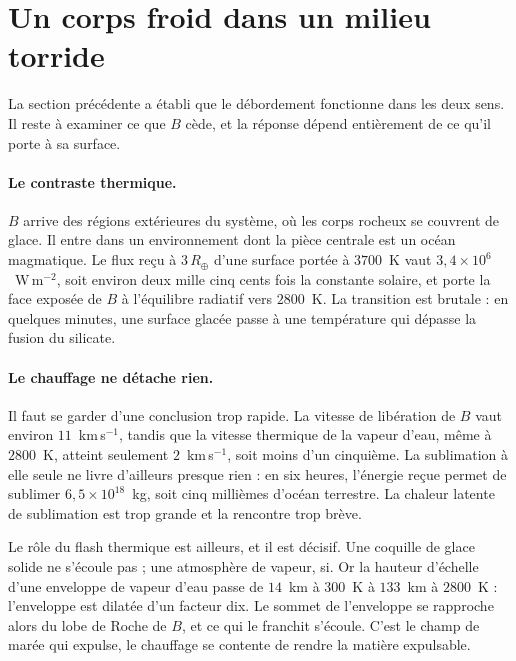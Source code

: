 \documentclass[11pt,a4paper,openany]{report}
\newcommand{\Rt}{R_{\oplus}}
\begin{document}
\section{Un corps froid dans un milieu torride}
\label{sec:eau}

La section précédente a établi que le débordement fonctionne dans les deux sens. Il reste à
examiner ce que $B$ cède, et la réponse dépend entièrement de ce qu'il porte à sa surface.

\paragraph{Le contraste thermique.} $B$ arrive des régions extérieures du système, où les corps
rocheux se couvrent de glace. Il entre dans un environnement dont la pièce centrale est un océan
magmatique. Le flux reçu à $3\,\Rt$ d'une surface portée à $3700$~K vaut
$3{,}4\times10^{6}$~W\,m$^{-2}$, soit environ deux mille cinq cents fois la constante solaire, et
porte la face exposée de $B$ à l'équilibre radiatif vers $2800$~K. La transition est brutale : en
quelques minutes, une surface glacée passe à une température qui dépasse la fusion du silicate.

\paragraph{Le chauffage ne détache rien.} Il faut se garder d'une conclusion trop rapide. La
vitesse de libération de $B$ vaut environ $11$~km\,s$^{-1}$, tandis que la vitesse thermique de la
vapeur d'eau, même à $2800$~K, atteint seulement $2$~km\,s$^{-1}$, soit moins d'un cinquième. La
sublimation à elle seule ne livre d'ailleurs presque rien : en six heures, l'énergie reçue permet
de sublimer $6{,}5\times10^{18}$~kg, soit cinq millièmes d'océan terrestre. La chaleur latente de
sublimation est trop grande et la rencontre trop brève.

\begin{ideephys}
Le rôle du flash thermique est ailleurs, et il est décisif. Une coquille de glace solide ne
s'écoule pas ; une atmosphère de vapeur, si. Or la hauteur d'échelle d'une enveloppe de vapeur
d'eau passe de $14$~km à $300$~K à $133$~km à $2800$~K : l'enveloppe est dilatée d'un facteur dix.
Le sommet de l'enveloppe se rapproche alors du lobe de Roche de $B$, et ce qui le franchit s'écoule.
C'est le champ de marée qui expulse, le chauffage se contente de rendre la matière expulsable.
\end{ideephys}
\end{document}
